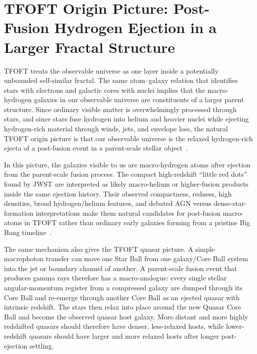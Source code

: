\documentclass[11pt,a4paper]{article}
\begin{document}
\section{TFOFT Origin Picture: Post-Fusion Hydrogen Ejection in a Larger Fractal Structure}
\label{sec:tfoft_origin_picture}

TFOFT treats the observable universe as one layer inside a potentially unbounded self-similar fractal. The same atom--galaxy relation that identifies stars with electrons and galactic cores with nuclei implies that the macro-hydrogen galaxies in our observable universe are constituents of a larger parent structure. Since ordinary visible matter is overwhelmingly processed through stars, and since stars fuse hydrogen into helium and heavier nuclei while ejecting hydrogen-rich material through winds, jets, and envelope loss, the natural TFOFT origin picture is that our observable universe is the relaxed hydrogen-rich ejecta of a post-fusion event in a parent-scale stellar object~\cite{Kippenhahn2012,CarrollOstlie2017}.

In this picture, the galaxies visible to us are macro-hydrogen atoms after ejection from the parent-scale fusion process. The compact high-redshift ``little red dots'' found by JWST are interpreted as likely macro-helium or higher-fusion products inside the same ejection history. Their observed compactness, redness, high densities, broad hydrogen/helium features, and debated AGN versus dense-star-formation interpretations make them natural candidates for post-fusion macro-atoms in TFOFT rather than ordinary early galaxies forming from a pristine Big Bang timeline~\cite{Labbe2023,Rusakov2025,VaidaFarber2026}.

The same mechanism also gives the TFOFT quasar picture. A simple macrophoton transfer can move one Star Ball from one galaxy/Core Ball system into the jet or boundary channel of another. A parent-scale fusion event that produces gamma rays therefore has a macro-analogue: every single stellar angular-momentum register from a compressed galaxy are dumped through its Core Ball and re-emerge through another Core Ball as an ejected quasar with intrinsic redshift. The stars then relax into place around the new Quasar Core Ball and become the observed quasar host galaxy. More distant and more highly redshifted quasars should therefore have denser, less-relaxed hosts, while lower-redshift quasars should have larger and more relaxed hosts after longer post-ejection settling.
\end{document}
